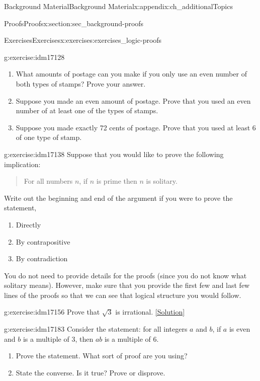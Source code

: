 \documentclass[oneside,10pt,]{book}
\numberwithin{equation}{chapter}
\begin{document}
\begin{appendixptx}{Background Material}{}{Background Material}{}{}{x:appendix:ch_additionalTopics}
\begin{sectionptx}{Proofs}{}{Proofs}{}{}{x:section:sec_background-proofs}
\begin{exercises-subsection}{Exercises}{}{Exercises}{}{}{x:exercises:exercises_logic-proofs}
\begin{divisionexercise}{4}{}{}{g:exercise:idm17128}
\begin{enumerate}[label=(\alph*)]
\item{}What amounts of postage can you make if you only use an even number of both types of stamps? Prove your answer.%
\item{}Suppose you made an even amount of postage. Prove that you used an even number of at least one of the types of stamps.%
\item{}Suppose you made exactly 72 cents of postage. Prove that you used at least 6 of one type of stamp.%
\end{enumerate}
%
\end{divisionexercise}%
\begin{divisionexercise}{5}{}{}{g:exercise:idm17138}%
Suppose that you would like to prove the following implication:%
\begin{quote}%
For all numbers \(n\), if \(n\) is prime then \(n\) is solitary.%
\end{quote}
Write out the beginning and end of the argument if you were to prove the statement,%
\par
%
\begin{enumerate}[label=(\alph*)]
\item{}Directly %
\item{}By contrapositive %
\item{}By contradiction %
\end{enumerate}
%
\par
You do not need to provide details for the proofs (since you do not know what solitary means). However, make sure that you provide the first few and last few lines of the proofs so that we can see that logical structure you would follow.%
\end{divisionexercise}%
\begin{divisionexercise}{6}{}{}{g:exercise:idm17156}%
Prove that \(\sqrt 3\) is irrational.%
\space\hspace*{0pt}\hfill{\tiny\hyperlink{g:solution:idm17160-main}{[Solution]}}\end{divisionexercise}%
\begin{divisionexercise}{7}{}{}{g:exercise:idm17183}%
Consider the statement: for all integers \(a\) and \(b\), if \(a\) is even and \(b\) is a multiple of 3, then \(ab\) is a multiple of 6.%
\par
%
\begin{enumerate}[label=(\alph*)]
\item{}Prove the statement. What sort of proof are you using?%
\item{}State the converse. Is it true? Prove or disprove.%

\end{enumerate}
\end{divisionexercise}
\end{exercises-subsection}
\end{sectionptx}
\end{appendixptx}
\end{document}
